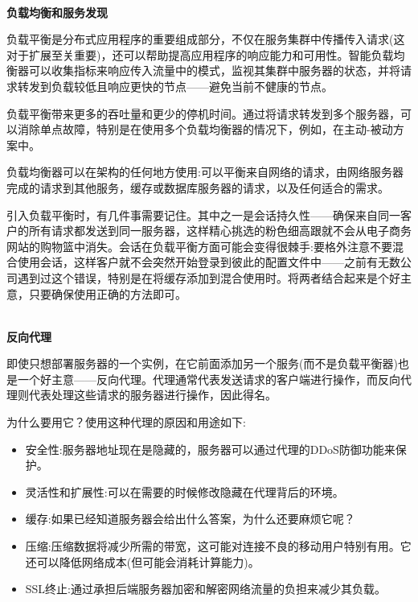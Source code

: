 \hspace*{\fill} \\ %
\noindent
\textbf{负载均衡和服务发现}

负载平衡是分布式应用程序的重要组成部分，不仅在服务集群中传播传入请求(这对于扩展至关重要)，还可以帮助提高应用程序的响应能力和可用性。智能负载均衡器可以收集指标来响应传入流量中的模式，监视其集群中服务器的状态，并将请求转发到负载较低且响应更快的节点——避免当前不健康的节点。

负载平衡带来更多的吞吐量和更少的停机时间。通过将请求转发到多个服务器，可以消除单点故障，特别是在使用多个负载均衡器的情况下，例如，在主动-被动方案中。

负载均衡器可以在架构的任何地方使用:可以平衡来自网络的请求，由网络服务器完成的请求到其他服务，缓存或数据库服务器的请求，以及任何适合的需求。

\begin{tcolorbox}[colback=webgreen!5!white,colframe=webgreen!75!black, title=TIP]
\hspace*{0.7cm}引入负载平衡时，有几件事需要记住。其中之一是会话持久性——确保来自同一客户的所有请求都发送到同一服务器，这样精心挑选的粉色细高跟就不会从电子商务网站的购物篮中消失。会话在负载平衡方面可能会变得很棘手:要格外注意不要混合使用会话，这样客户就不会突然开始登录到彼此的配置文件中——之前有无数公司遇到过这个错误，特别是在将缓存添加到混合使用时。将两者结合起来是个好主意，只要确保使用正确的方法即可。
\end{tcolorbox}

\hspace*{\fill} \\ %
\noindent
\textbf{反向代理}

即使只想部署服务器的一个实例，在它前面添加另一个服务(而不是负载平衡器)也是一个好主意——反向代理。代理通常代表发送请求的客户端进行操作，而反向代理则代表处理这些请求的服务器进行操作，因此得名。

为什么要用它？使用这种代理的原因和用途如下:

\begin{itemize}
\item 
安全性:服务器地址现在是隐藏的，服务器可以通过代理的DDoS防御功能来保护。

\item 
灵活性和扩展性:可以在需要的时候修改隐藏在代理背后的环境。

\item 
缓存:如果已经知道服务器会给出什么答案，为什么还要麻烦它呢？

\item 
压缩:压缩数据将减少所需的带宽，这可能对连接不良的移动用户特别有用。它还可以降低网络成本(但可能会消耗计算能力)。

\item 
SSL终止:通过承担后端服务器加密和解密网络流量的负担来减少其负载。
\end{itemize}

